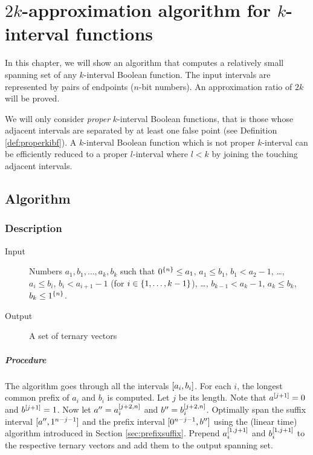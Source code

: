 \chapter{\texorpdfstring{$2k$}{2k}-approximation algorithm
for \texorpdfstring{$k$}{k}-interval functions}
\label{chap:2kapprox}


In this chapter,
we will show an algorithm that computes
a relatively
small spanning set
of any $k$-interval Boolean function.
The input intervals are represented by pairs of endpoints
($n$-bit numbers).
An approximation ratio of $2k$ will be proved.

We will only consider
\emph{proper} $k$-interval Boolean functions,
that is those whose adjacent intervals are separated by
at least one false point
(see Definition \ref{def:properkibf}).
A $k$-interval Boolean function
which is not proper $k$-interval
can be efficiently reduced to a proper $l$-interval
where $l < k$
by joining the touching adjacent intervals.

\section{Algorithm}

\subsection{Description}

\begin{description}
\item[Input] Numbers $a_1, b_1, \ldots, a_k, b_k$
such that
$0^{\{n\}} \leq a_1$,
$a_1 \leq b_1$,
$b_1 < a_2 - 1$,
\ldots,
$a_i \leq b_i$,
$b_i < a_{i+1} - 1$
(for $i \in \{1, \ldots, k-1\}$),
\ldots,
$b_{k-1} < a_k - 1$,
$a_k \leq b_k$,
$b_k \leq 1^{\{n\}}$.

\item[Output] A set of ternary vectors
\end{description}

\paragraph{Procedure}
The algorithm goes through
all the intervals $[a_i, b_i]$.
For each $i$, the longest common prefix of $a_i$ and $b_i$
is computed. Let $j$ be its length.
Note that $a^{[j+1]} = 0$ and $b^{[j+1]} = 1$.
Now let $a'' = a_i^{[j+2, n]}$
and $b'' = b_i^{[j+2, n]}$.
Optimally span the suffix interval
$[a'', 1^{n-j-1}]$
and the prefix interval
$[0^{n-j-1}, b'']$
using the (linear time) algorithm
introduced in Section \ref{sec:prefixsuffix}.
Prepend $a_i^{[1, j+1]}$
and $b_i^{[1, j+1]}$
to the respective ternary vectors
and add them to the output spanning set.

